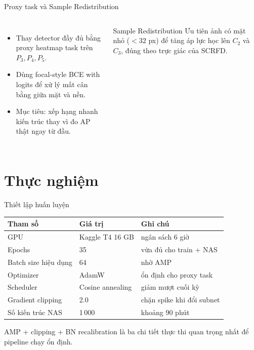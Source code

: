 \documentclass[aspectratio=169,11pt]{beamer}
\begin{document}
\begin{frame}{Proxy task và Sample Redistribution}
  \begin{columns}[T,onlytextwidth]
    \begin{itemize}
      \setlength{\itemsep}{5pt}
      \item Thay detector đầy đủ bằng proxy heatmap task trên \(P_3, P_4, P_5\).
      \item Dùng focal-style BCE with logits để xử lý mất cân bằng giữa mặt và nền. \cite{lin2017focal}
      \item Mục tiêu: xếp hạng nhanh kiến trúc thay vì đo AP thật ngay từ đầu.
    \end{itemize}
    \begin{block}{Sample Redistribution}
      Ưu tiên ảnh có mặt nhỏ (\(< 32\) px) để tăng áp lực học lên \(C_2\) và \(C_3\), đúng theo trực giác của SCRFD. \cite{yang2016widerface}
    \end{block}
  \end{columns}
\end{frame}

\section{Thực nghiệm}

\begin{frame}{Thiết lập huấn luyện}
  \small
  \begin{tabular}{@{}p{}p{}p{}@{}}
    \toprule
    Tham số & Giá trị & Ghi chú \\
    \midrule
    GPU & Kaggle T4 16 GB & ngân sách 6 giờ \\
    Epochs & 35 & vừa đủ cho train + NAS \\
    Batch size hiệu dụng & 64 & nhờ AMP \\
    Optimizer & AdamW & ổn định cho proxy task \\
    Scheduler & Cosine annealing & giảm mượt cuối kỳ \\
    Gradient clipping & 2.0 & chặn spike khi đổi subnet \\
    Số kiến trúc NAS & 1\,000 & khoảng 90 phút \\
    \bottomrule
  \end{tabular}

  \vspace{6pt}
  AMP + clipping + BN recalibration là ba chi tiết thực thi quan trọng nhất để pipeline chạy ổn định.
\end{frame}
\end{document}
